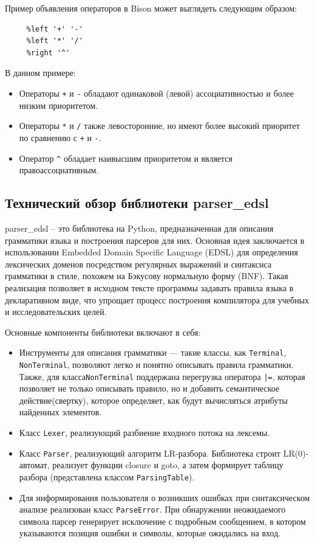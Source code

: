 \documentclass[14pt, russian]{scrartcl}
\begin{document}
Пример объявления операторов в Bison может выглядеть следующим образом:

\begin{verbatim}
	 %left '+' '-'
	 %left '*' '/'
	 %right '^'
\end{verbatim}

В данном примере:
\begin{itemize}
	\item Операторы \verb|+| и \verb|-| обладают одинаковой (левой)
	ассоциативностью и более низким приоритетом.
	\item Операторы \verb|*| и \verb|/| также левосторонние,
	но имеют более высокий приоритет по сравнению с \verb|+| и \verb|-|.
	\item Оператор \verb|^| обладает
	наивысшим приоритетом и является правоассоциативным.
\end{itemize}

\subsection{Технический обзор библиотеки parser\_edsl}

parser\_edsl – это библиотека на Python, предназначенная для описания грамматики языка и построения парсеров для них.
 Основная идея заключается в использовании Embedded Domain Specific Language (EDSL)
для определения лексических доменов посредством регулярных выражений и синтаксиса грамматики в стиле, похожем
на Бэкусову нормальную форму (BNF). Такая реализация позволяет в исходном тексте программы задавать правила
языка в декларативном виде, что упрощает процесс построения компилятора для учебных и исследовательских целей.

Основные компоненты библиотеки включают в себя:

\begin{itemize}
	\item Инструменты для описания грамматики --- такие классы, как \texttt{Terminal}, \texttt{NonTerminal}, позволяют легко и понятно описывать правила грамматики.
		Также, для класса\texttt{NonTerminal} поддержана перегрузка оператора \texttt{|=}, которая позволяет не только описывать
		правило, но и добавить семантическое действие(свертку), которое определяет, как будут
		вычисляться атрибуты найденных элементов.
	\item Класс \texttt{Lexer}, реализующий разбиение входного потока на лексемы.
	\item Класс \texttt{Parser}, реализующий алгоритм LR-разбора.  Библиотека строит LR(0)-автомат, реализует
	функции closure и goto, а затем формирует таблицу разбора (представлена классом \texttt{ParsingTable}).
	\item Для информирования пользователя о возникших ошибках при синтаксическом анализе реализован класс \texttt{ParseError}.
	 При обнаружении неожидаемого символа парсер генерирует исключение с подробным сообщением, в
	 котором указываются позиция ошибки и символы, которые ожидались на вход.
\end{itemize}
\end{document}
